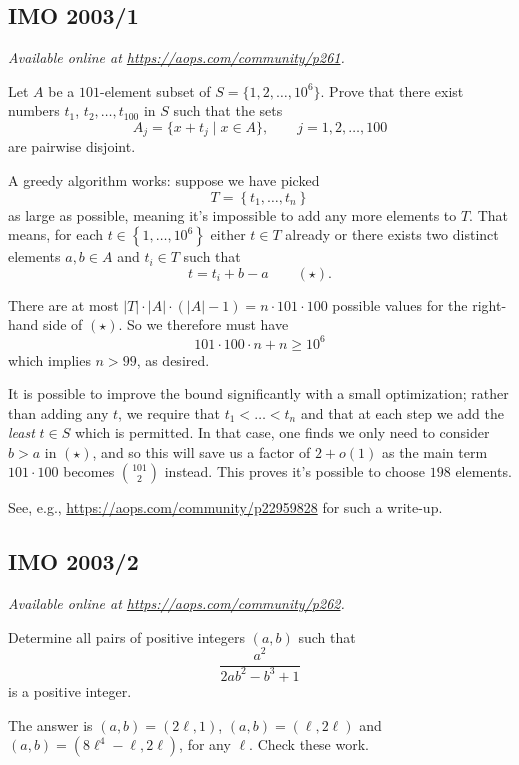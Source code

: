 \documentclass[11pt]{scrartcl}
\begin{document}
\subsection{IMO 2003/1}
\textsl{Available online at \url{https://aops.com/community/p261}.}
\begin{mdframed}[style=mdpurplebox,frametitle={Problem statement}]
Let $A$ be a $101$-element subset of $S=\{1,2,\dots,10^6\}$.
Prove that there exist numbers $t_1$, $t_2, \dots, t_{100}$ in $S$ such that the sets
\[ A_j=\{x+t_j\mid x\in A\},\qquad j=1,2,\dots,100  \]
are pairwise disjoint.
\end{mdframed}
A greedy algorithm works: suppose we have picked
\[ T = \left\{ t_1, \dots, t_n \right\} \]
as large as possible, meaning it's impossible to add any more elements to $T$.
That means, for each $t \in \left\{ 1, \dots, 10^6 \right\}$ either $t \in T$ already
or there exists two distinct elements $a, b \in A$ and $t_i \in T$ such that
\[ t = t_i + b - a \qquad (\star).  \]

There are at most
$|T| \cdot |A| \cdot \left( |A|-1 \right) = n \cdot 101 \cdot 100$
possible values for the right-hand side of $(\star)$.
So we therefore must have
\[ 101 \cdot 100 \cdot n + n \ge 10^6 \]
which implies $n > 99$, as desired.

\begin{remark*}
  It is possible to improve the bound significantly with a small optimization;
  rather than adding any $t$, we require that $t_1 < \dots < t_n$
  and that at each step we add the \emph{least} $t \in S$ which is permitted.
  In that case, one finds we only need to consider $b > a$ in $(\star)$,
  and so this will save us a factor of $2+o(1)$
  as the main term $101 \cdot 100$ becomes $\binom{101}{2}$ instead.
  This proves it's possible to choose $198$ elements.

  See, e.g., \url{https://aops.com/community/p22959828} for such a write-up.
\end{remark*}
\pagebreak

\subsection{IMO 2003/2}
\textsl{Available online at \url{https://aops.com/community/p262}.}
\begin{mdframed}[style=mdpurplebox,frametitle={Problem statement}]
Determine all pairs of positive integers $(a,b)$ such that
\[ \frac{a^2}{2ab^2-b^3+1} \]
is a positive integer.
\end{mdframed}
The answer is $(a,b) = (2\ell, 1)$, $(a,b) = (\ell, 2\ell)$
and $(a,b) = (8\ell^4-\ell, 2\ell)$, for any $\ell$.
Check these work.
\end{document}
